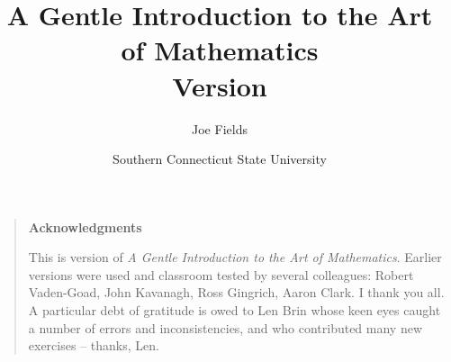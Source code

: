 \documentclass[pdftex,12pt,twoside]{book}
\begin{document}
\frontmatter

\title{A Gentle Introduction to the Art of Mathematics\\ {\small Version \versionNum {} }}
\author{Joe Fields}
\date{Southern Connecticut State University}

\maketitle

\clearpage



\clearpage

\rule{0pt}{0pt}

\vfill

\begin{quote}
{\Large \bf Acknowledgments} 

   This is version \versionNum of {\em A Gentle Introduction to the Art of Mathematics}.
Earlier versions were used and classroom tested by several colleagues: 
Robert Vaden-Goad, John Kavanagh, Ross Gingrich, Aaron Clark.  I thank you all.  
A particular debt of gratitude is owed to Len Brin whose keen eyes caught 
a number of errors and inconsistencies, and who contributed many new 
exercises -- thanks, Len. 
  
\end{quote}

\vfill


\clearpage

\tableofcontents

\listoffigures

\listoftables

%
%

\mainmatter













{}%


%

{}
\printindex
\end{document}

